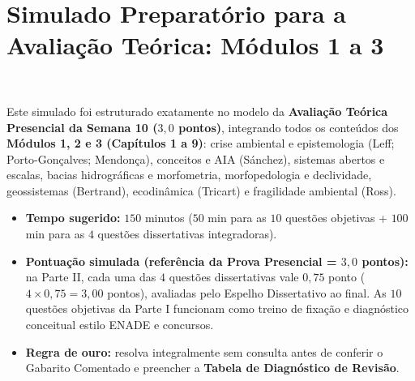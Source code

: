 
\clearpage
{}
{}
\chapter*{Simulado Preparatório para a Avaliação Teórica: Módulos 1 a 3}

\noindent\tagEmenta\ \tagPratica

\vspace{6pt}

\begin{boxConceito}
  Este simulado foi estruturado exatamente no modelo da \textbf{Avaliação Teórica Presencial da Semana 10 ($3{,}0$ pontos)}, integrando todos os conteúdos dos \textbf{Módulos 1, 2 e 3 (Capítulos 1 a 9)}: crise ambiental e epistemologia (Leff; Porto-Gonçalves; Mendonça), conceitos e AIA (Sánchez), sistemas abertos e escalas, bacias hidrográficas e morfometria, morfopedologia e declividade, geossistemas (Bertrand), ecodinâmica (Tricart) e fragilidade ambiental (Ross).
  \begin{itemize}[leftmargin=1.5em, itemsep=2pt]
    \item \textbf{Tempo sugerido:} $150$ minutos ($50$ min para as $10$ questões objetivas + $100$ min para as $4$ questões dissertativas integradoras).
    \item \textbf{Pontuação simulada (referência da Prova Presencial = $3{,}0$ pontos):} na Parte II, cada uma das $4$ questões dissertativas vale $0{,}75$ ponto ($4 \times 0{,}75 = 3{,}00$ pontos), avaliadas pelo Espelho Dissertativo ao final. As $10$ questões objetivas da Parte I funcionam como treino de fixação e diagnóstico conceitual estilo ENADE e concursos.
    \item \textbf{Regra de ouro:} resolva integralmente sem consulta antes de conferir o Gabarito Comentado e preencher a \textbf{Tabela de Diagnóstico de Revisão}.
  \end{itemize}
\end{boxConceito}

